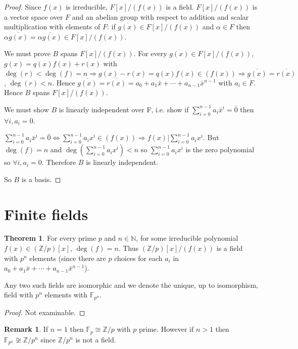 \documentclass[12pt,a4paper]{article}
\theoremstyle{definition}
\newtheorem{theorem}[definition]{Theorem}
\newtheorem*{remark}{Remark}
\begin{document}
\begin{proof}
	Since $f(x)$ is irreducible, $F[x] / (f(x))$ is a field. $F[x]/(f(x))$ is a vector space over $F$ and an abelian group with respect to addition and scalar multiplication with elements of $F$: if $\overline{g(x)} \in F[x] / (f(x))$ and $\alpha \in F$ then $\alpha \overline{g(x)} = \overline{\alpha g(x)} \in F[x] / (f(x))$.

	We must prove $B$ spans $F[x] / (f(x))$. For every $\overline{g(x)} \in F[x] / (f(x))$, $g(x) = q(x) f(x) + r(x)$ with $\deg(r) < \deg(f) = n \Rightarrow g(x) - r(x) = q(x) f(x) \in (f(x)) \Rightarrow \overline{g(x)} = \overline{r(x)}$, $\deg(r) < n$. Hence $\overline{g(x)} = \overline{r(x)} = a_0 + a_1 \bar{x} + \cdots + a_{n - 1} \bar{x}^{n - 1}$ with $a_i \in F$. Hence $B$ spans $F[x] / (f(x))$.

	We must show $B$ is linearly independent over F, i.e. show if $\sum_{i = 0}^{n - 1} a_i \bar{x}^i = \bar{0}$ then $\forall i, a_i = 0$.

	$\sum_{i = 0}^{n - 1} a_i \bar{x}^i = \bar{0} \Leftrightarrow \sum_{i = 0}^{n - 1} a_i x^i \in (f(x)) \Rightarrow f(x) | \sum_{i = 0}^{n - 1} a_i x^i$. But $\deg(f) = n$ and $\deg(\sum_{i = 0}^{n - 1} a_i x^i) < n$ so $\sum_{i = 0}^{n - 1} a_i x^i$ is the zero polynomial so $\forall i, a_i = 0$. Therefore $B$ is linearly independent.

	So $B$ is a basis.
\end{proof}

\section{Finite fields}

\begin{theorem}
	For every prime $p$ and $n \in \mathbb{N}$, for some irreducible polynomial $f(x) \in (\mathbb{Z} / p)[x]$, $\deg(f) = n$. Thus $(\mathbb{Z} / p)[x] / (f(x))$ is a field with $p^n$ elements (since there are $p$ choices for each $a_i$ in $a_0 + a_1 \bar{x} + \cdots + a_{n - 1}\bar{x}^{n - 1}$).

	Any two such fields are isomorphic and we denote the unique, up to isomorphism, field with $p^n$ elements with $\mathbb{F}_{p^n}$.
\end{theorem}

\begin{proof}
	Not examinable.
\end{proof}

\begin{remark}
	If $n = 1$ then $\mathbb{F}_p \cong \mathbb{Z} / p$ with $p$ prime. However if $n > 1$ then $\mathbb{F}_{p^n} \not\cong \mathbb{Z} / p^n$ since $\mathbb{Z} / p^n$ is not a field.
\end{remark}
\end{document}
